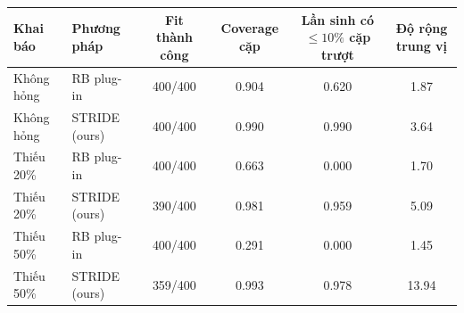 \begin{tabular}{llcccc}
\toprule
Khai báo & Phương pháp & Fit thành công & Coverage cặp & Lần sinh có $\le10\%$ cặp trượt & Độ rộng trung vị\\
\midrule
Không hỏng & RB plug-in & 400/400 & 0.904 & 0.620 & 1.87 \\
Không hỏng & STRIDE (ours) & 400/400 & 0.990 & 0.990 & 3.64 \\
Thiếu 20\% & RB plug-in & 400/400 & 0.663 & 0.000 & 1.70 \\
Thiếu 20\% & STRIDE (ours) & 390/400 & 0.981 & 0.959 & 5.09 \\
Thiếu 50\% & RB plug-in & 400/400 & 0.291 & 0.000 & 1.45 \\
Thiếu 50\% & STRIDE (ours) & 359/400 & 0.993 & 0.978 & 13.94 \\
\bottomrule
\end{tabular}
